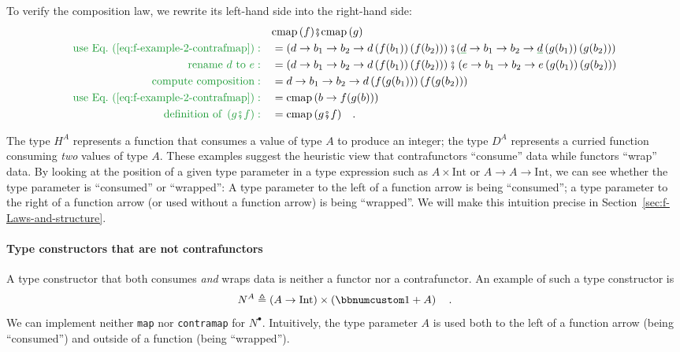 To verify the composition law, we rewrite its left-hand side into
the right-hand side:
\begin{align*}
 & \text{cmap}\,(f)\bef\text{cmap}\,(g)\\
{\color{greenunder}\text{use Eq.~(\ref{eq:f-example-2-contrafmap})}:}\quad & =\left(d\rightarrow b_{1}\rightarrow b_{2}\rightarrow d\left(f(b_{1})\right)\left(f(b_{2})\right)\right)\bef(\gunderline d\rightarrow b_{1}\rightarrow b_{2}\rightarrow\gunderline d\left(g(b_{1})\right)\left(g(b_{2})\right))\\
{\color{greenunder}\text{rename }d\text{ to }e:}\quad & =\left(d\rightarrow b_{1}\rightarrow b_{2}\rightarrow d\left(f(b_{1})\right)\left(f(b_{2})\right)\right)\bef\left(e\rightarrow b_{1}\rightarrow b_{2}\rightarrow e\left(g(b_{1})\right)\left(g(b_{2})\right)\right)\\
{\color{greenunder}\text{compute composition}:}\quad & =d\rightarrow b_{1}\rightarrow b_{2}\rightarrow d\left(f(g(b_{1}))\right)\left(f(g(b_{2}))\right)\\
{\color{greenunder}\text{use Eq.~(\ref{eq:f-example-2-contrafmap})}:}\quad & =\text{cmap}\,(b\rightarrow f(g(b)))\\
{\color{greenunder}\text{definition of }\left(g\bef f\right):}\quad & =\text{cmap}\,(g\bef f)\quad.
\end{align*}

The type $H^{A}$ represents a function that consumes a value of type
$A$ to produce an integer; the type $D^{A}$ represents a curried
function consuming \emph{two} values of type $A$. These examples
suggest the heuristic view that contrafunctors \textsf{``}consume\textsf{''} data
while functors \textsf{``}wrap\textsf{''} data. By looking at the position of a given
type parameter in a type expression such as $A\times\text{Int}$ or
$A\rightarrow A\rightarrow\text{Int}$, we can see whether the type
parameter is \textsf{``}consumed\textsf{''} or \textsf{``}wrapped\textsf{''}: A type parameter to
the left of a function arrow is being \textsf{``}consumed\textsf{''}; a type parameter
to the right of a function arrow (or used without a function arrow)
is being \textsf{``}wrapped\textsf{''}. We will make this intuition precise in Section~\ref{sec:f-Laws-and-structure}.

\paragraph{Type constructors that are not contrafunctors }

A type constructor that both consumes \emph{and} wraps data is neither
a functor nor a contrafunctor. An example of such a type constructor
is
\[
N^{A}\triangleq\left(A\rightarrow\text{Int}\right)\times\left(\bbnum 1+A\right)\quad.
\]
We can implement neither \lstinline!map! nor \lstinline!contramap!
for $N^{\bullet}$. Intuitively, the type parameter $A$ is used both
to the left of a function arrow (being \textsf{``}consumed\textsf{''}) and outside
of a function (being \textsf{``}wrapped\textsf{''}).

